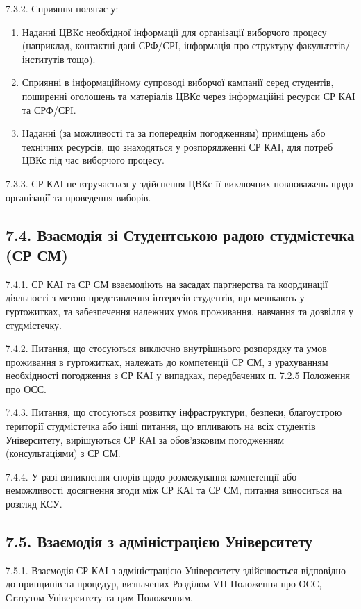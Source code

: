     7.3.2. Сприяння полягає у:

        \begin{enumerate}[label=\alph*)]
            \item Наданні ЦВКс необхідної інформації для організації виборчого процесу (наприклад, контактні дані СРФ/СРІ, інформація про структуру факультетів/інститутів тощо).
            \item Сприянні в інформаційному супроводі виборчої кампанії серед студентів, поширенні оголошень та матеріалів ЦВКс через інформаційні ресурси СР КАІ та СРФ/СРІ.
            \item Наданні (за можливості та за попереднім погодженням) приміщень або технічних ресурсів, що знаходяться у розпорядженні СР КАІ, для потреб ЦВКс під час виборчого процесу.
        \end{enumerate}

    7.3.3. СР КАІ не втручається у здійснення ЦВКс її виключних повноважень щодо організації та проведення виборів.

\subsection*{7.4. Взаємодія зі Студентською радою студмістечка (СР СМ)}
    7.4.1. СР КАІ та СР СМ взаємодіють на засадах партнерства та координації діяльності з метою представлення інтересів студентів, що мешкають у гуртожитках, та забезпечення належних умов проживання, навчання та дозвілля у студмістечку.

    7.4.2. Питання, що стосуються виключно внутрішнього розпорядку та умов проживання в гуртожитках, належать до компетенції СР СМ, з урахуванням необхідності погодження з СР КАІ у випадках, передбачених п. 7.2.5 Положення про ОСС.

    7.4.3. Питання, що стосуються розвитку інфраструктури, безпеки, благоустрою території студмістечка або інші питання, що впливають на всіх студентів Університету, вирішуються СР КАІ за обов'язковим погодженням (консультаціями) з СР СМ.

    7.4.4. У разі виникнення спорів щодо розмежування компетенції або неможливості досягнення згоди між СР КАІ та СР СМ, питання виноситься на розгляд КСУ.

\subsection*{7.5. Взаємодія з адміністрацією Університету}
    7.5.1. Взаємодія СР КАІ з адміністрацією Університету здійснюється відповідно до принципів та процедур, визначених Розділом VII Положення про ОСС, Статутом Університету та цим Положенням.

